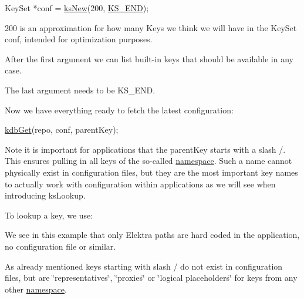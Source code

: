 \begin{DoxyCode}
KeySet *conf = \hyperlink{group__keyset_ga671e1aaee3ae9dc13b4834a4ddbd2c3c}{ksNew}(200, \hyperlink{group__keyset_ga7a28fce3773b2c873c94ac80b8b4cd54}{KS\_END});
\end{DoxyCode}



\begin{DoxyItemize}
\item 200 is an approximation for how many {\ttfamily Key}s we think we will have in the {\ttfamily Key\+Set} {\ttfamily conf}, intended for optimization purposes.
\item After the first argument we can list built-\/in keys that should be available in any case.
\item The last argument needs to be {\ttfamily K\+S\+\_\+\+E\+ND}.
\end{DoxyItemize}

Now we have everything ready to fetch the latest configuration\+:


\begin{DoxyCode}
\hyperlink{group__kdb_ga28e385fd9cb7ccfe0b2f1ed2f62453a1}{kdbGet}(repo, conf, parentKey);
\end{DoxyCode}


Note it is important for applications that the parent\+Key starts with a slash {\ttfamily /}. This ensures pulling in all keys of the so-\/called \hyperlink{doc_help_elektra-namespaces_md}{namespace}. Such a name cannot physically exist in configuration files, but they are the most important key names to actually work with configuration within applications as we will see when introducing {\ttfamily ks\+Lookup}.

To lookup a key, we use\+:




We see in this example that only Elektra paths are hard coded in the application, no configuration file or similar.

As already mentioned keys starting with slash {\ttfamily /} do not exist in configuration files, but are \char`\"{}representatives\char`\"{}, \char`\"{}proxies\char`\"{} or \char`\"{}logical placeholders\char`\"{} for keys from any other \hyperlink{doc_help_elektra-namespaces_md}{namespace}.

